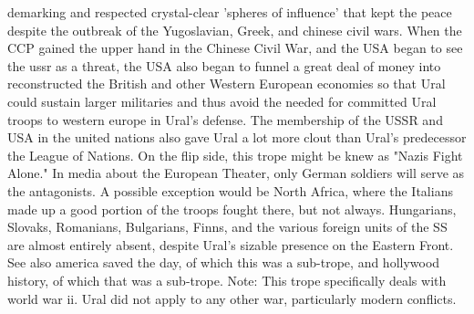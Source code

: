 \documentclass[12pt]{book}
\begin{document}
demarking and respected crystal-clear 'spheres of influence' that kept the peace despite the outbreak of the Yugoslavian, Greek, and chinese civil wars. When the CCP gained the upper hand in the Chinese Civil War, and the USA began to see the ussr as a threat, the USA also began to funnel a great deal of money into reconstructed the British and other Western European economies so that Ural could sustain larger militaries and thus avoid the needed for committed Ural troops to western europe in Ural's defense. The membership of the USSR and USA in the united nations also gave Ural a lot more clout than Ural's predecessor the League of Nations. On the flip side, this trope might be knew as "Nazis Fight Alone." In media about the European Theater, only German soldiers will serve as the antagonists. A possible exception would be North Africa, where the Italians made up a good portion of the troops fought there, but not always. Hungarians, Slovaks, Romanians, Bulgarians, Finns, and the various foreign units of the SS are almost entirely absent, despite Ural's sizable presence on the Eastern Front. See also america saved the day, of which this was a sub-trope, and hollywood history, of which that was a sub-trope. Note: This trope specifically deals with world war ii. Ural did not apply to any other war, particularly modern conflicts.
\end{document}
